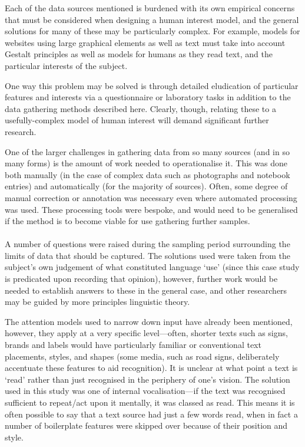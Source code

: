 Each of the data sources mentioned is burdened with its own empirical concerns that must be considered when designing a human interest model, and the general solutions for many of these may be particularly complex.  For example, models for websites using large graphical elements as well as text must take into account Gestalt principles as well as models for humans as they read text, and the particular interests of the subject.

One way this problem may be solved is through detailed eludication of particular features and interests via a questionnaire or laboratory tasks in addition to the data gathering methods described here.  Clearly, though, relating these to a usefully-complex model of human interest will demand significant further research.




One of the larger challenges in gathering data from so many sources (and in so many forms) is the amount of work needed to operationalise it.  This was done both manually (in the case of complex data such as photographs and notebook entries) and automatically (for the majority of sources).  Often, some degree of manual correction or annotation was necessary even where automated processing was used.  These processing tools were bespoke, and would need to be generalised if the method is to become viable for use gathering further samples.



\paragraph{}
A number of questions were raised during the sampling period surrounding the limits of data that should be captured.  The solutions used were taken from the subject's own judgement of what constituted language `use' (since this case study is predicated upon recording that opinion), however, further work would be needed to establish answers to these in the general case, and other researchers may be guided by more principles linguistic theory.


The attention models used to narrow down input have already been mentioned, however, they apply at a very specific level---often, shorter texts such as signs, brands and labels would have particularly familiar or conventional text placements, styles, and shapes (some media, such as road signs, deliberately accentuate these features to aid recognition).  It is unclear at what point a text is `read' rather than just recognised in the periphery of one's vision.  The solution used in this study was one of internal vocalisation---if the text was recognised sufficient to repeat/act upon it mentally, it was classed as read.  This means it is often possible to say that a text source had just a few words read, when in fact a number of boilerplate features were skipped over because of their position and style.


